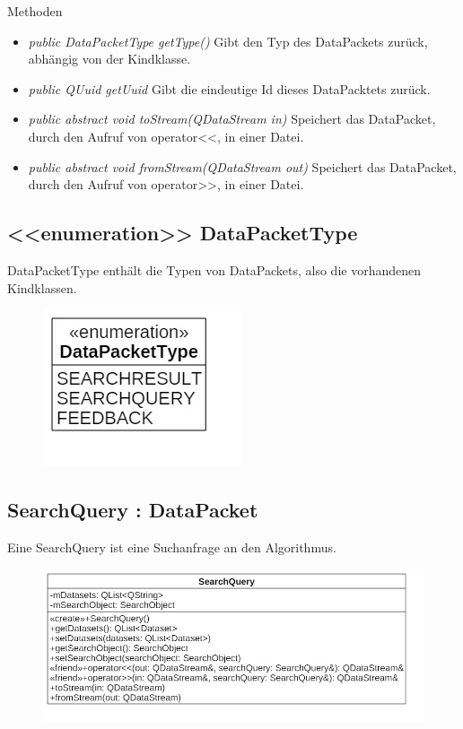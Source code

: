 Methoden
\begin{itemize}
\item \textit{public DataPacketType getType()} Gibt den Typ des DataPackets zurück, abhängig von der Kindklasse.
\item\textit{public QUuid getUuid} Gibt die eindeutige Id dieses DataPacktets zurück.
\item \textit{public abstract void toStream(QDataStream in)} Speichert das DataPacket, durch den Aufruf von operator<<, in einer Datei.
\item \textit{public abstract void fromStream(QDataStream out)} Speichert das DataPacket, durch den Aufruf von operator>>, in einer Datei.
\end{itemize}

\subsection*{<<enumeration>> DataPacketType}
DataPacketType enthält die Typen von DataPackets, also die vorhandenen Kindklassen.

\begin{figure}[H]
\centering
\includegraphics[scale=0.5]{img/Klassendiagramm/Klassen/Model/DataPacketType}
\label{fig:dataPacketType}
\end{figure}

\subsection*{SearchQuery : DataPacket}
Eine SearchQuery ist eine Suchanfrage an den Algorithmus.

\begin{figure}[H]
\centering
\includegraphics[scale=0.5]{img/Klassendiagramm/Klassen/Model/SearchQuery}
\label{fig:searchQuery}
\end{figure}

